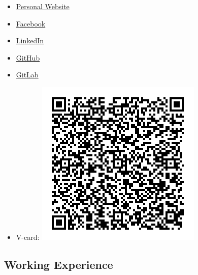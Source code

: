 \documentclass[a4paper,oneside,11pt]{article}
\begin{document}
\begin{itemize}

\item \href{https://iosang.github.io}{Personal Website}

\item \href{https://www.facebook.com/metimdjai}{Facebook}

\item \href{https://www.linkedin.com/in/iosif-angelidis/}{LinkedIn}

\item \href{https://github.com/metimdjai}{GitHub}

\item \href{https://gitlab.com/metimdjai}{GitLab}

\item V-card: \includegraphics[scale=0.5]{qr.png}%

\end{itemize}

\newpage

\subsection*{Working Experience}
\end{document}
